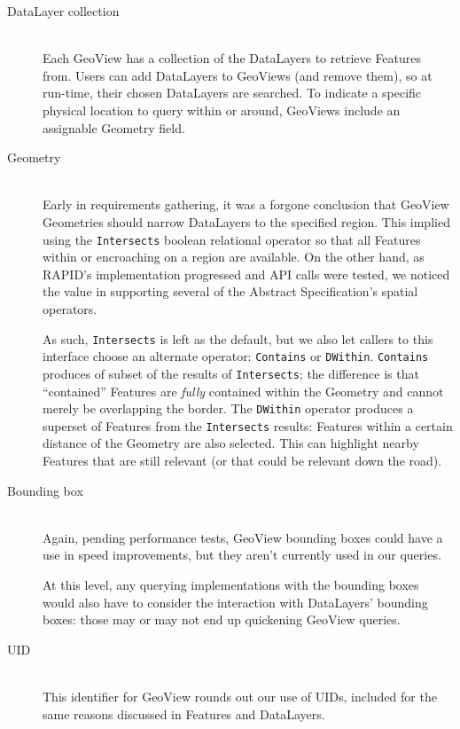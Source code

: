 \begin{description}

\item[DataLayer collection] \hfill \\
Each GeoView has a collection of the DataLayers to retrieve Features from. Users can add DataLayers to GeoViews (and remove them), so at run-time, their chosen DataLayers are searched. To indicate a specific physical location to query within or around, GeoViews include an assignable Geometry field.

\item[Geometry] \hfill \\
Early in requirements gathering, it was a forgone conclusion that GeoView Geometries should narrow DataLayers to the specified region. This implied using the \texttt{Intersects} boolean relational operator so that all Features within or encroaching on a region are available. On the other hand, as RAPID's implementation progressed and API calls were tested, we noticed the value in supporting several of the Abstract Specification's spatial operators.

As such, \texttt{Intersects} is left as the default, but we also let callers to this interface choose an alternate operator: \texttt{Contains} or \texttt{DWithin}. \texttt{Contains} produces of subset of the results of \texttt{Intersects}; the difference is that ``contained'' Features are \textit{fully} contained within the Geometry and cannot merely be overlapping the border. The \texttt{DWithin} operator produces a superset of Features from the \texttt{Intersects} results: Features within a certain distance of the Geometry are also selected. This can highlight nearby Features that are still relevant (or that could be relevant down the road).

\item[Bounding box] \hfill \\
Again, pending performance tests, GeoView bounding boxes could have a use in speed improvements, but they aren't currently used in our queries.

At this level, any querying implementations with the bounding boxes would also have to consider the interaction with DataLayers' bounding boxes: those may or may not end up quickening GeoView queries.

\item[UID] \hfill \\
This identifier for GeoView rounds out our use of UIDs, included for the same reasons discussed in Features and DataLayers.


\end{description}
